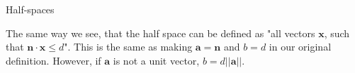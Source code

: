 \documentclass{beamer}
\begin{document}
\begin{frame}{Half-spaces}
\begin{flushleft}
\begin{figure} [h!]
\begin{center}

\end{center} 
\end{figure}

The same way we see, that the half space can be defined as "all vectors $\mathbf{x}$, such that $\mathbf{n} \cdot \mathbf{x} \leq d$". This is the same as making $\mathbf{a} = \mathbf{n}$ and $b = d$ in our original definition. However, if $\mathbf{a}$ is not a unit vector, $b = d ||\mathbf{a}||$.
 
\end{flushleft}
\end{frame}
\end{document}
